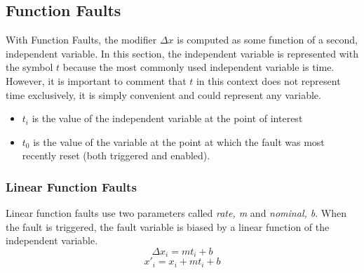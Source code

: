 \documentclass[11pt,fleqn]{report}
\begin{document}
\subsection{Function Faults} \label{sec:formulation:faults:function}

With Function Faults, the modifier $\Delta x$ is computed as some function of a
second, independent variable. In this section, the independent variable is
represented with the symbol $t$ because the most commonly used independent
variable is time. However, it is important to comment that $t$ in this context
does not represent time exclusively, it is simply convenient and could represent
any variable.
\begin{itemize}
  \item $t_i$ is the value of the independent variable at the point of
    interest
  \item $t_0$ is the value of the variable at the point at which the fault was
    most recently reset (both triggered and enabled).
\end{itemize}

\subsubsection{Linear Function Faults}
\par Linear function faults use two parameters called \textit{rate, m} and
\textit{nominal, b}.
When the fault is triggered, the fault variable is biased by a linear function
of the independent variable.
\begin{equation*}
\Delta x_i = m t_i + b
\end{equation*}
\begin{equation} \label{eqn:linfunc}
x'_i = x_i + m t_i + b
\end{equation}
\end{document}
